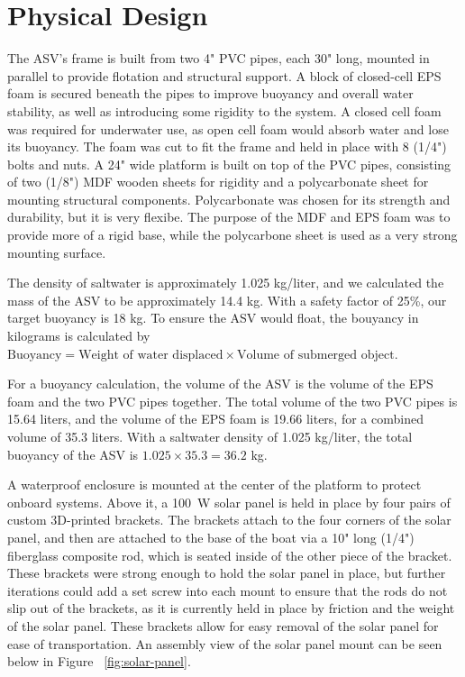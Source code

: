 \section{Physical Design}

The ASV's frame is built from two 4" PVC pipes, each 30" long, mounted in parallel to provide flotation and structural support. A block of closed-cell EPS foam is secured beneath the pipes to improve buoyancy and overall water stability, as well as introducing some rigidity to the system. A closed cell foam was required for underwater use, as open cell foam would absorb water and lose its buoyancy. The foam was cut to fit the frame and held in place with 8 (1/4") bolts and nuts. A 24" wide platform is built on top of the PVC pipes, consisting of two (1/8") MDF wooden sheets for rigidity and a polycarbonate sheet for mounting structural components. Polycarbonate was chosen for its strength and durability, but it is very flexibe. The purpose of the MDF and EPS foam was to provide more of a rigid base, while the polycarbone sheet is used as a very strong mounting surface. 

The density of saltwater is approximately 1.025 kg/liter, and we calculated the mass of the ASV to be approximately 14.4 kg. With a safety factor of 25\%, our target buoyancy is 18 kg. To ensure the ASV would float, the bouyancy in kilograms is calculated by \(\text{Buoyancy} = \text{Weight of water displaced} \times \text{Volume of submerged object}\). 

For a buoyancy calculation, the volume of the ASV is the volume of the EPS foam and the two PVC pipes together. The total volume of the two PVC pipes is 15.64 liters, and the volume of the EPS foam is 19.66 liters, for a combined volume of 35.3 liters. With a saltwater density of 1.025 kg/liter, the total buoyancy of the ASV is \(1.025 \times 35.3 = 36.2 \) kg.

A waterproof enclosure is mounted at the center of the platform to protect onboard systems. Above it, a \SI{100}{\watt} solar panel is held in place by four pairs of custom 3D-printed brackets. The brackets attach to the four corners of the solar panel, and then are attached to the base of the boat via a 10" long (1/4") fiberglass composite rod, which is seated inside of the other piece of the bracket. These brackets were strong enough to hold the solar panel in place, but further iterations could add a set screw into each mount to ensure that the rods do not slip out of the brackets, as it is currently held in place by friction and the weight of the solar panel. These brackets allow for easy removal of the solar panel for ease of transportation. An assembly view of the solar panel mount can be seen below in Figure ~\ref{fig:solar-panel}.

